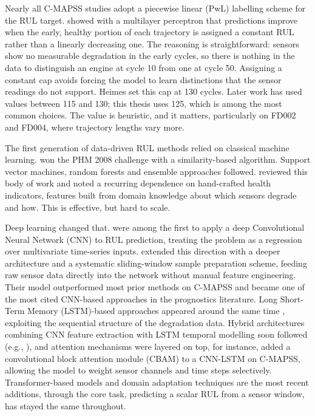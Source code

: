 Nearly all C-MAPSS studies adopt a piecewise linear (PwL) labelling scheme for the RUL target. \cite{Heimes2008} showed with a multilayer perceptron that predictions improve when the early, healthy portion of each trajectory is assigned a constant RUL rather than a linearly decreasing one. The reasoning is straightforward: sensors show no measurable degradation in the early cycles, so there is nothing in the data to distinguish an engine at cycle 10 from one at cycle 50. Assigning a constant cap avoids forcing the model to learn distinctions that the sensor readings do not support. Heimes set this cap at 130 cycles. Later work has used values between 115 and 130; this thesis uses 125, which is among the most common choices. The value is heuristic, and it matters, particularly on FD002 and FD004, where trajectory lengths vary more.

The first generation of data-driven RUL methods relied on classical machine learning. \cite{Wang2008} won the PHM 2008 challenge with a similarity-based algorithm. Support vector machines, random forests and ensemble approaches followed. \cite{Ramasso2014} reviewed this body of work and noted a recurring dependence on hand-crafted health indicators, features built from domain knowledge about which sensors degrade and how. This is effective, but hard to scale.

Deep learning changed that. \cite{SateeshBabu2016} were among the first to apply a deep Convolutional Neural Network (CNN) to RUL prediction, treating the problem as a regression over multivariate time-series inputs. \cite{Li2018} extended this direction with a deeper architecture and a systematic sliding-window sample preparation scheme, feeding raw sensor data directly into the network without manual feature engineering. Their model outperformed most prior methods on C-MAPSS and became one of the most cited CNN-based approaches in the prognostics literature. Long Short-Term Memory (LSTM)-based approaches appeared around the same time \citep{Zheng2017,Wu2018}, exploiting the sequential structure of the degradation data. Hybrid architectures combining CNN feature extraction with LSTM temporal modelling soon followed (e.g., \cite{Zhao2017}), and attention mechanisms were layered on top, for instance, \cite{LiCBAM2022} added a convolutional block attention module (CBAM) to a CNN-LSTM on C-MAPSS, allowing the model to weight sensor channels and time steps selectively. Transformer-based models and domain adaptation techniques are the most recent additions, through the core task, predicting a scalar RUL from a sensor window, has stayed the same throughout.

